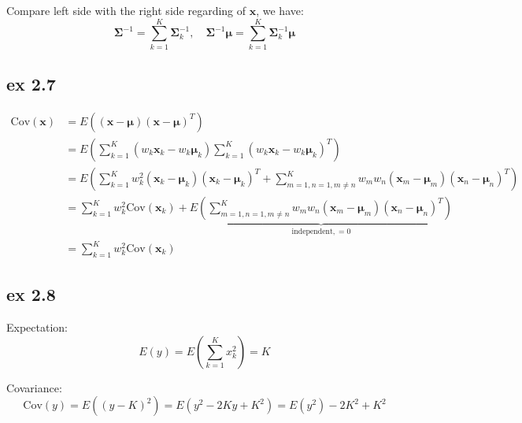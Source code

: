 \documentclass[10pt]{article}
\begin{document}
Compare left side with the right side regarding of $\mathbf{x}$, we have:
\begin{equation}
{\boldsymbol{\Sigma} ^{ - 1}} = \sum\limits_{k = 1}^K {\boldsymbol{\Sigma} _k^{ - 1}} , \quad {\boldsymbol{\Sigma} ^{ - 1}}\boldsymbol{\mu}  = \sum\limits_{k = 1}^K {\boldsymbol{\Sigma} _k^{ - 1}\boldsymbol{\mu} }
\end{equation}

\subsection{ex 2.7}
\begin{equation}
\begin{split}
\mathrm{Cov}(\mathbf{x}) &= E((\mathbf{x} - \boldsymbol{\mu} ){(\mathbf{x} - \boldsymbol{\mu} )^T})\\
&= E\left( {\sum\limits_{k = 1}^K {\left( {{w_k}{\mathbf{x}_k} - {w_k}{\boldsymbol{\mu} _k}} \right)} \sum\limits_{k = 1}^K {{{\left( {{w_k}{\mathbf{x}_k} - {w_k}{\boldsymbol{\mu} _k}} \right)}^T}} } \right)\\
&= E\left( {\sum\limits_{k = 1}^K {w_k^2\left( {{\mathbf{x}_k} - {\boldsymbol{\mu} _k}} \right){{\left( {{\mathbf{x}_k} - {\boldsymbol{\mu} _k}} \right)}^T}}  + \sum\limits_{m=1,n=1,m\ne n}^K {{w_m}{w_n}\left( {{\mathbf{x}_m} - {\boldsymbol{\mu} _m}} \right){{\left( {{\mathbf{x}_n} - {\boldsymbol{\mu} _n}} \right)}^T}} } \right)\\
&= \sum\limits_{k = 1}^K {w_k^2\mathrm{Cov}\left( {{\mathbf{x}_k}} \right)}  + \underbrace {E\left( {\sum\limits_{m=1,n=1,m\ne n}^K {{w_m}{w_n}\left( {{\mathbf{x}_m} - {\boldsymbol{\mu} _m}} \right){{\left( {{\mathbf{x}_n} - {\boldsymbol{\mu} _n}} \right)}^T}} } \right)}_{\mathrm{independent} , = 0}\\
&= \sum\limits_{k = 1}^K {w_k^2\mathrm{Cov}\left( {{\mathbf{x}_k}} \right)} 
\end{split}
\end{equation}

\subsection{ex 2.8}
Expectation:
\begin{equation}
E\left( y \right) = E\left( {\sum\limits_{k = 1}^K {x_k^2} } \right) = K
\end{equation}

Covariance:
\begin{equation}
\mathrm{Cov}\left( y \right) = E\left( {{{\left( {y - K} \right)}^2}} \right) = E\left( {{y^2} - 2Ky + {K^2}} \right) = E\left( {{y^2}} \right) - 2{K^2} + {K^2}
\end{equation}
\end{document}
